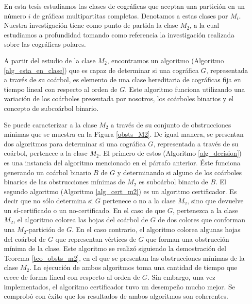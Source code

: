 En esta tesis estudiamos las clases de cográficas que aceptan una partición en un número $i$ de gráficas multipartitas completas. Denotamos a estas clases por $M_i$. Nuestra investigación tiene como punto de partida la clase $M_2$, a la cual estudiamos a profundidad tomando como referencia la investigación realizada sobre las cográficas polares. 

A partir del estudio de la clase $M_2$, encontramos un algoritmo (Algoritmo \ref{alg_esta_en_clase}) que es capaz de determinar si una cográfica $G$, representada a través de su coárbol, es elemento de una clase hereditaria de cográficas fija en tiempo lineal con respecto al orden de $G$. Este algoritmo funciona utilizando una variación de los coárboles presentada por nosotros, los coárboles binarios y el concepto de subcoárbol binario. 

Se puede caracterizar a la clase $M_2$ a través de su conjunto de obstrucciones mínimas que se muestra en la Figura \ref{obsts_M2}. De igual manera, se presentan dos algoritmos para determinar si una cográfica $G$, representada a través de su coárbol, pertenece a la clase $M_2$. El primero de estos (Algoritmo \ref{alg_decision}) es una instancia del algoritmo mencionado en el párrafo anterior. Éste funciona generando un coárbol binario $B$ de $G$ y determinando si alguno de los coárboles binarios de las obstrucciones mínimas de $M_2$ es suboárbol binario de $B$. El segundo algoritmo (Algoritmo \ref{alg_cert_m2}) es un algoritmo certificador. Es decir que no sólo determina si $G$ pertenece o no a la clase $M_2$, sino que devuelve un sí-certificado o un no-certificado. En el caso de que $G$, pertenezca a la clase $M_2$, el algoritmo colorea las hojas del coárbol de $G$ de dos colores que conforman una $M_2$-partición de $G$. En el caso contrario, el algoritmo colorea algunas hojas del coárbol de $G$ que representan vértices de $G$ que forman una obstrucción mínima de la clase. Este algoritmo se realizó siguiendo la demostración del Teorema \ref{teo_obsts_m2}, en el que se presentan las obstrucciones mínimas de la clase $M_2$. La ejecución de ambos algoritmos toma una cantidad de tiempo que crece de forma lineal con respecto al orden de $G$. Sin embargo, una vez implementados, el algoritmo certificador tuvo un desempeño mucho mejor. Se comprobó con éxito que los resultados de ambos algoritmos son coherentes. 

